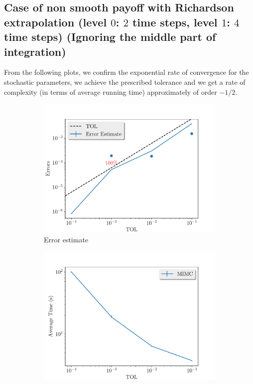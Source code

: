 \documentclass[11pt]{article}
\begin{document}
\newpage

\subsection{Case of non smooth payoff  with Richardson extrapolation (level $0$: $2$ time steps, level $1$: $4$ time steps) (Ignoring the middle part of integration)}

From the following plots, we confirm the exponential rate of convergence for the stochastic parameters, we achieve the prescribed tolerance and  we get a rate of complexity (in terms of average running time) approximately of order $-1/2$.

\begin{figure}[!h]
	\centering
	\begin{subfigure}{.5\textwidth}
		\centering
		\includegraphics[width=1\linewidth]{./figures/1D_BS_2_4_step_non_smooth_richardson_without_middle/error_estimate.pdf}
		\caption{Error estimate}
		\label{fig:misc_1D_BS_2_4_step_non_smooth_richardson_without_middle_sub1}
	\end{subfigure}%
	\begin{subfigure}{.5\textwidth}
		\centering
		\includegraphics[width=1\linewidth]{./figures/1D_BS_2_4_step_non_smooth_richardson_without_middle/average_running_time.pdf}

\end{subfigure}
\end{figure}
\end{document}
